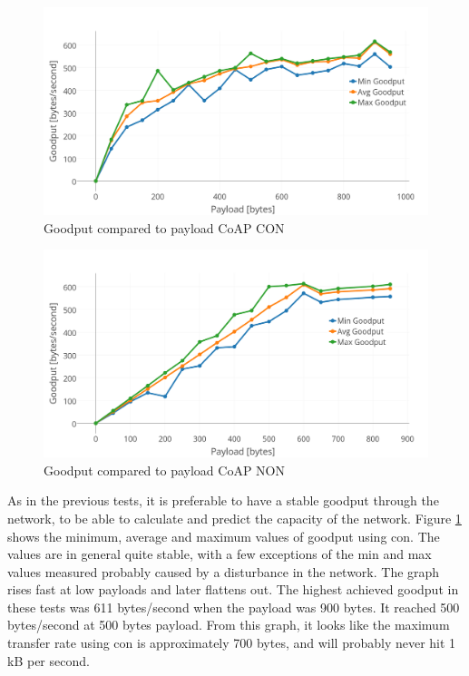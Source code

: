 \begin{figure}[ht]
    \centering
    \includegraphics[width=1.0\textwidth]{goodput_payload_CON.png}    
    \caption{Goodput compared to payload CoAP CON}
    \label{fig:goodPayload_CON}
\end{figure}

\begin{figure}[h!]
    \centering
    \includegraphics[width=1.0\textwidth]{goodput_payload_NON.png}    
    \caption{Goodput compared to payload CoAP NON}
    \label{fig:goodPayload_NON}
\end{figure}


\noindent As in the previous tests, it is preferable to have a stable \gls{goodput} through the network, to be able to calculate and predict the capacity of the network. Figure \ref{fig:goodPayload_CON} shows the minimum, average and maximum values of \gls{goodput} using \gls{con}. The values are in general quite stable, with a few exceptions of the min and max values measured probably caused by a disturbance in the network. The graph rises fast at low \glspl{payload} and later flattens out. The highest achieved \gls{goodput} in these tests was 611 bytes/second when the \gls{payload} was 900 bytes. It reached 500 bytes/second at 500 bytes \gls{payload}. From this graph, it looks like the maximum transfer rate using \gls{con} is approximately 700 bytes, and will probably never hit 1 kB per second. 

